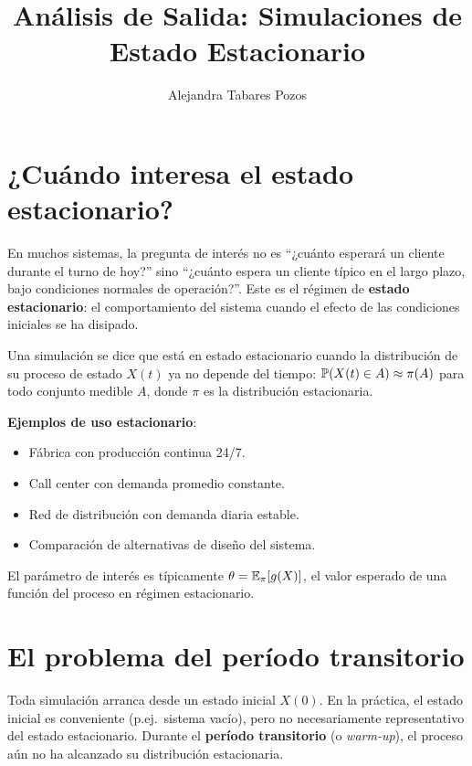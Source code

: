 \documentclass[11pt, letterpaper]{article}
\title{Análisis de Salida: Simulaciones de Estado Estacionario}
\author{Alejandra Tabares Pozos}
\date{}
\begin{document}
\maketitle
\tableofcontents
\newpage

\section{¿Cuándo interesa el estado estacionario?}

En muchos sistemas, la pregunta de interés no es ``¿cuánto esperará un cliente durante el turno de hoy?'' sino ``¿cuánto espera un cliente típico en el largo plazo, bajo condiciones normales de operación?''. Este es el régimen de \textbf{estado estacionario}: el comportamiento del sistema cuando el efecto de las condiciones iniciales se ha disipado.

\begin{definicionbox}
Una simulación se dice que está en estado estacionario cuando la distribución de su proceso de estado $X(t)$ ya no depende del tiempo: $\mathbb{P}(X(t) \in A) \approx \pi(A)$ para todo conjunto medible $A$, donde $\pi$ es la distribución estacionaria.
\end{definicionbox}

\textbf{Ejemplos de uso estacionario}:
\begin{itemize}
    \item Fábrica con producción continua 24/7.
    \item Call center con demanda promedio constante.
    \item Red de distribución con demanda diaria estable.
    \item Comparación de alternativas de diseño del sistema.
\end{itemize}

El parámetro de interés es típicamente $\theta = \mathbb{E}_\pi[g(X)]$, el valor esperado de una función del proceso en régimen estacionario.

\section{El problema del período transitorio}

Toda simulación arranca desde un estado inicial $X(0)$. En la práctica, el estado inicial es conveniente (p.ej.\ sistema vacío), pero no necesariamente representativo del estado estacionario. Durante el \textbf{período transitorio} (o \emph{warm-up}), el proceso aún no ha alcanzado su distribución estacionaria.
\end{document}
